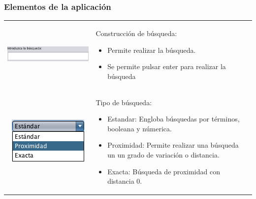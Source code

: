 \documentclass{beamer} %
\begin{document}
\begin{frame}
	\frametitle{Elementos de la aplicación}
	\begin{tabular}{cl}
		\begin{minipage}{0.33\textwidth}	
			\begin{center}
					\includegraphics[scale=0.35]{Img/Img3.png}
			\end{center}
		\end{minipage}
 	 & 
		\begin{minipage}[t]{0.6\textwidth}
		Construcción de búsqueda:
    	\begin{itemize}
    		\item Permite realizar la búsqueda.
    		\item Se permite pulsar enter para realizar la búsqueda
    	\end{itemize}
 	 \end{minipage}\\
		\begin{minipage}{0.33\textwidth}	
			\begin{center}
					\includegraphics[scale=0.35]{Img/Img4.png}
			\end{center}		
		\end{minipage}  
	& 
	\begin{minipage}[t]{0.6\textwidth}
	Tipo de búsqueda:
    	\begin{itemize}
    		\item Estandar: Engloba búsquedas por términos, booleana y númerica.
    		\item Proximidad: Permite realizar una búsqueda un un grado de variación o distancia.
    		\item Exacta: Búsqueda de proximidad con distancia 0.
    	\end{itemize}
 	 \end{minipage}\\
	\end{tabular} 
\end{frame}
	         
\end{document}
